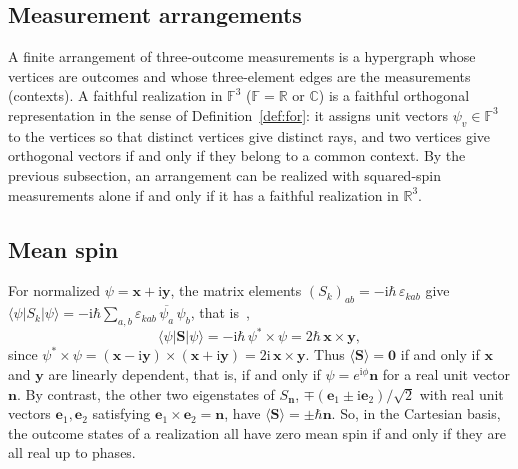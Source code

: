 \documentclass[twocolumn,aps,pra,floatfix,amsmath,amssymb,longbibliography]{revtex4-2}
\newcommand{\ii}{\mathrm{i}}
\newcommand{\C}{\mathbb{C}}
\newcommand{\R}{\mathbb{R}}
\begin{document}
\subsection{Measurement arrangements}
A finite arrangement of three-outcome measurements is a hypergraph whose vertices are outcomes and whose three-element edges are the measurements (contexts).  A faithful realization in $\mathbb F^3$ ($\mathbb F=\R$ or $\C$) is a faithful orthogonal representation in the sense of Definition~\ref{def:for}: it assigns unit vectors $\psi_v\in\mathbb F^3$ to the vertices so that distinct vertices give distinct rays, and two vertices give orthogonal vectors if and only if they belong to a common context.  By the previous subsection, an arrangement can be realized with squared-spin measurements alone if and only if it has a faithful realization in $\R^3$.

\subsection{Mean spin}
For normalized $\psi=\mathbf x+\ii\mathbf y$, the matrix elements $(S_k)_{ab}=-\ii\hbar\,\varepsilon_{kab}$ give $\langle\psi|S_k|\psi\rangle=-\ii\hbar\sum_{a,b}\varepsilon_{kab}\,\overline{\psi_a}\,\psi_b$, that is~\cite{ZiboldEtAl2016SpinNematic},
\begin{equation}
 \langle\psi|\mathbf S|\psi\rangle
 =-\ii\hbar\,\psi^*\times\psi
 =2\hbar\,\mathbf x\times\mathbf y,
 \label{eq:mean-spin}
\end{equation}
since $\psi^*\times\psi=(\mathbf x-\ii\mathbf y)\times(\mathbf x+\ii\mathbf y)=2\ii\,\mathbf x\times\mathbf y$.  Thus $\langle\mathbf S\rangle=\mathbf 0$ if and only if $\mathbf x$ and $\mathbf y$ are linearly dependent, that is, if and only if $\psi=e^{\ii\phi}\mathbf n$ for a real unit vector $\mathbf n$.  By contrast, the other two eigenstates of $S_{\mathbf n}$, $\mp(\mathbf e_1\pm\ii\mathbf e_2)/\sqrt2$ with real unit vectors $\mathbf e_1,\mathbf e_2$ satisfying $\mathbf e_1\times\mathbf e_2=\mathbf n$, have $\langle\mathbf S\rangle=\pm\hbar\mathbf n$.  So, in the Cartesian basis, the outcome states of a realization all have zero mean spin if and only if they are all real up to phases.
\end{document}
